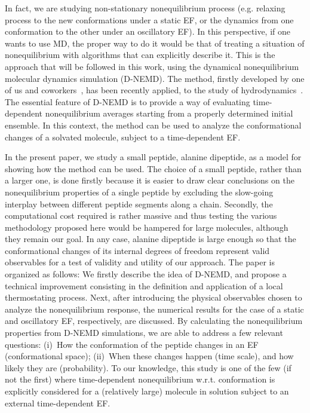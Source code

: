 \documentclass[a4paper,preprint,unsortedaddress,onecolumn]{revtex4-1}
\begin{document}
In fact, we are studying non-stationary nonequilibrium process
(e.g. relaxing process to the new conformations under a static
EF, or the dynamics from one conformation to the other under an oscillatory EF).
In this perspective, if one wants to use MD, the proper way to do it would be that of treating a situation of nonequilibrium with algorithms that can explicitly describe it.
This is the approach that will be followed in this work, using
the dynamical nonequilibrium molecular dynamics simulation (D-NEMD).
The method, firstly developed by one of us and coworkers~\cite{ciccotti1975direct, ciccotti1979thought, ciccotti1993theoretical, palla2008bulk}, 
has been recently applied, to the study of
hydrodynamics~\cite{orlandini2011hydrodynamics,
  orlandini2011hydrodynamics-01}. The essential feature of D-NEMD is to
provide a way of evaluating time-dependent
nonequilibrium averages starting from a properly determined initial ensemble.
In this context, the method can be used to analyze the
conformational changes of a solvated molecule, subject to a time-dependent EF.

In the present paper, we study a small peptide, alanine dipeptide, as a model for showing how the method can be used. 
The choice of a small peptide, rather than a larger one, is done firstly because it
is easier to draw clear conclusions on the nonequilibrium properties
of a single peptide by excluding the slow-going interplay between
different peptide segments along a chain. 
Secondly, the computational cost required is rather massive and thus  testing
the various methodology proposed here would be hampered for large molecules,
although they remain our goal.  In any case, alanine dipeptide
is large enough so that the conformational changes of its internal degrees of freedom represent valid observables for a test of validity and utility of our approach.
The paper is organized as follows:
  We firstly describe the idea of D-NEMD, and propose a technical improvement consisting in the definition and application of a local thermostating process.
Next, after introducing the physical
observables chosen to analyze the nonequilibrium response,
the numerical results for the case of a static and oscillatory EF, respectively, are discussed. By calculating the nonequilibrium properties from D-NEMD
simulations, we are able to address
a few relevant questions: (i)~How the conformation of the peptide
changes in an EF (conformational space);
(ii)~When these changes happen (time scale),
and how likely they are (probability). 
To our knowledge, this study is one of the few (if not the first)  where
time-dependent nonequilibrium w.r.t. conformation
is explicitly considered for a (relatively large) molecule
in solution subject to an external time-dependent EF.
\end{document}
